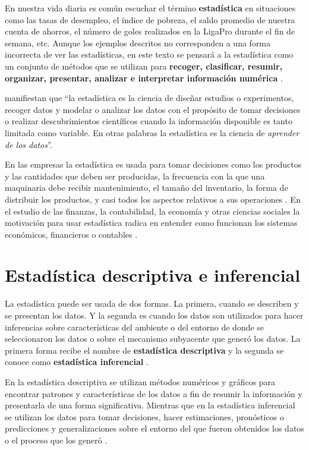 \documentclass[
]{krantz}
\begin{document}
En nuestra vida diaria es común escuchar el término \textbf{estadística} en situaciones como las tasas de desempleo, el índice de pobreza, el saldo promedio de nuestra cuenta de ahorros, el número de goles realizados en la LigaPro durante el fin de semana, etc. Aunque los ejemplos descritos no corresponden a una forma incorrecta de ver las estadísticas, en este texto se pensará
a la estadística como un conjunto de métodos que se utilizan para \textbf{recoger, clasificar, resumir, organizar, presentar, analizar e interpretar información numérica} \citep{cleff2013}.

\citet{lyman2010} manifiestan que ``la estadística es la ciencia de diseñar estudios o experimentos, recoger datos y modelar o analizar los datos con el propósito de tomar decisiones o realizar descubrimientos científicos cuando la información disponible es tanto limitada como variable. En otras palabras la estadística es la ciencia de \emph{aprender de los datos}''.

En las empresas la estadística es usada para tomar decisiones como los productos y las cantidades que deben ser producidas, la frecuencia con la que una maquinaria debe recibir mantenimiento, el tamaño del inventario, la forma de distribuir los productos, y casi todos los aspectos relativos a sus operaciones \citep{barrow2006}. En el estudio de las finanzas, la contabilidad, la economía y otras ciencias sociales la motivación para usar estadística radica en entender como funcionan los sistemas económicos, financieros o contables \citep{berenson2012}.

\hypertarget{estypes}{%
\section{Estadística descriptiva e inferencial}\label{estypes}}

La estadística puede ser usada de dos formas. La primera, cuando se describen y se presentan los datos. Y la segunda es cuando los datos son utilizados para hacer inferencias sobre características del ambiente o del entorno de donde se seleccionaron los datos o sobre el mecanismo subyacente que generó los datos. La primera forma recibe el nombre de \textbf{estadística descriptiva} y la segunda se conoce como \textbf{estadística inferencial} \citep{rossman2018}.

En la estadística descriptiva se utilizan métodos numéricos y gráficos para encontrar patrones y características de los datos a fin de resumir la información y presentarla de una forma significativa. Mientras que en la estadística inferencial se utilizan los datos para tomar decisiones, hacer estimaciones, pronósticos o predicciones y generalizaciones sobre el entorno del que fueron obtenidos los datos o el proceso que los generó \citep{cleff2013}.
\end{document}
